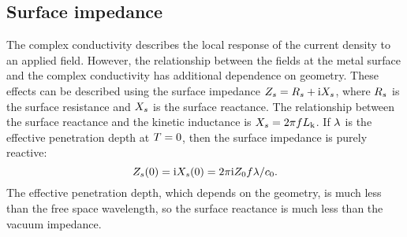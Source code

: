 \subsection{Surface impedance}
\label{sec:theory.electrodynamics.surface_impedance}

The complex conductivity describes the local response of the current density to an applied field.
However, the relationship between the fields at the metal surface and the complex conductivity has additional dependence on geometry.
These effects can be described using the surface impedance $Z_s = R_s + \mathrm{i} X_s$,
where
$R_s$ is the surface resistance and $X_s$ is the surface reactance.
The relationship between the surface reactance and the kinetic inductance is $X_s = 2 \pi f L_{\mathrm{k}}$.
If $\lambda$ is the effective penetration depth at $T = 0$, then the surface impedance is purely reactive:
\begin{equation}
Z_s(0)
  =
  \mathrm{i} X_s(0)
  =
  2 \pi \mathrm{i} Z_0 f \lambda / c_0.
\end{equation}
The effective penetration depth, which depends on the geometry, is much less than the free space wavelength, so the surface reactance is much less than the vacuum impedance.

